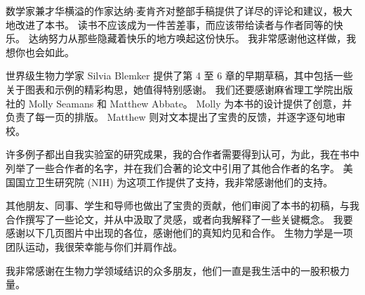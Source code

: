 \documentclass[cn,10pt,citestyle=gb7714-2015, bibstyle=gb7714-2015]{elegantbook}
\begin{document}
数学家兼才华横溢的作家达纳$\cdot$麦肯齐对整部手稿提供了详尽的评论和建议，极大地改进了本书。
读书不应该成为一件苦差事，而应该带给读者与作者同等的快乐。
达纳努力从那些隐藏着快乐的地方唤起这份快乐。
我非常感谢他这样做，我想你也会如此。


世界级生物力学家 Silvia Blemker 提供了第 4 至 6 章的早期草稿，其中包括一些关于图表和示例的精彩构思，她值得特别感谢。
我们还要感谢麻省理工学院出版社的 Molly Seamans 和 Matthew Abbate。
Molly 为本书的设计提供了创意，并负责了每一页的排版。
Matthew 则对文本提出了宝贵的反馈，并逐字逐句地审校。



许多例子都出自我实验室的研究成果，我的合作者需要得到认可，为此，我在书中列举了一些合作者的名字，并在我们合著的论文中引用了其他合作者的名字。
美国国立卫生研究院 (NIH) 为这项工作提供了支持，我非常感谢他们的支持。


其他朋友、同事、学生和导师也做出了宝贵的贡献，他们审阅了本书的初稿，与我合作撰写了一些论文，并从中汲取了灵感，或者向我解释了一些关键概念。
我要感谢以下几页图片中出现的各位，感谢他们的真知灼见和合作。
生物力学是一项团队运动，我很荣幸能与你们并肩作战。



我非常感谢在生物力学领域结识的众多朋友，他们一直是我生活中的一股积极力量。




\tableofcontents

\mainmatter



















\nocite{*} 
\printbibliography
\end{document}
